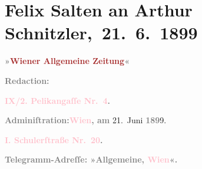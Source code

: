 

\renewcommand{\erwaehntePersonen}{Personen: Paul Goldmann, Georg Hirschfeld, Hugo von Hofmannsthal, Gustav Schwarzkopf, Julius Szeps}
\renewcommand{\erwaehnteInstitutionen}{Institutionen: Burgtheater, Wiener Allgemeine Zeitung}
\renewcommand{\erwaehnteOrte}{Orte: Berlin, Budapest, Pelikangasse, Schulerstraße, Slawonien, Wien}
\renewcommand{\erwaehnteWerke}{Werke: ?? [Feuilleton über Paul Goldmann], Reigen. Zehn Dialoge, Scene aus der »Hochzeit der Sobeide«. (Ältere Niederschrift. Wien 1897. — Ungedruckt.), Wiener Allgemeine Montags-Zeitung, Wiener Allgemeine Rundschau}
\section[ Felix Salten an Arthur Schnitzler, 21. 6. 1899]{Felix Salten an Arthur Schnitzler, 21. 6. 1899}
\nopagebreak{}
\rehead{ }\normalsize\beginnumbering{}
\toendnotes[C]{\smallbreak\pagebreak[2]}
\toendnotes[C]{\smallbreak}
\pstart
           \noindent{}{\pb}\textcolor{gray}{\textbf{\textbf{»\textcolor{brown}{Wiener Allgemeine
                        Zeitung}{}\ledrightnote{\textcolor{brown}{Wiener Allgemeine Zeitung}}«}}}\pend
           
\pstart
           \textcolor{gray}{\textbf{Redaction:}}\pend
           
\pstart
           \textcolor{gray}{\textbf{\textbf{\textcolor{pink}{IX/2. Pelikangaſſe Nr. 4}{}\ledrightnote{\textcolor{pink}{Pelikangasse}}.}}}\pend
           
\pstart
           \textcolor{gray}{\textbf{Adminiſtration:}}\hfill \textcolor{gray}{\textbf{\textcolor{pink}{Wien}{}\ledrightnote{\textcolor{pink}{Wien}}, am}}{ }21. Juni \textcolor{gray}{\textbf{189}}9.\pend
           
\pstart
           \textcolor{gray}{\textbf{\textbf{\textcolor{pink}{I. Schulerſtraße Nr. 20}{}\ledrightnote{\textcolor{pink}{Schulerstraße}}.}}}\pend
           
\pstart
           \textcolor{gray}{\textbf{Telegramm-Adreſſe: »Allgemeine, \textcolor{pink}{Wien}{}\ledrightnote{\textcolor{pink}{Wien}}«.}}\pend
           
